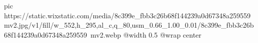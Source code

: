  
 
 
 
 

\ifcmt
  pic https://static.wixstatic.com/media/8c399e_fbb3c26b68f144239a0d67348a259559~mv2.jpg/v1/fill/w_552,h_295,al_c,q_80,usm_0.66_1.00_0.01/8c399e_fbb3c26b68f144239a0d67348a259559~mv2.webp
  @width 0.5
  @wrap center
\fi
